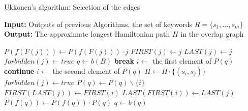 \documentclass[english,twoside,censored,csm,algorithms-track-2020]{HYthesisML}
\theoremstyle{plain}
\theoremstyle{definition}
\numberwithin{testexample}{chapter}
\begin{document}
  \begin{algorithm}[!ht]
    \caption{Ukkonen's algorithm: Selection of the edges} \label{ukk-h}
    \hspace*{\algorithmicindent} \textbf{Input:} Outputs of previous Algorithms, the set of keywords $R=\{s_1,...,s_m\}$ \\
    \hspace*{\algorithmicindent} \textbf{Output:} The approximate longest Hamiltonian path $H$ in the overlap graph
    \begin{algorithmic}[1]
            \State $P(f(F(j)))\gets P(f(F(j)))\cdot {j}$
            \State $FIRST(j)\gets j$
            \State $LAST(j)\gets j$
          \Else
            \State $forbidden(j)\gets true$
          \EndIf
        \EndFor  
        \State $q\gets b(B)$
               \footnotemark[1]
                \State \textbf{break}
              \EndIf
              \State $i\gets$ the first element of $P(q)$
                  \State \textbf{continue}
                \Else
                  \State $i\gets$ the second element of $P(q)$
                \EndIf
              \EndIf  
              \State $H\gets H\cdot \{(s_i,s_j)\}$
              \State $forbidden(j)\gets true$
              \State $P(q)\gets P(q) \backslash\{i\}$
              \State $FIRST(LAST(j))\gets FIRST(i)$
              \State $LAST(FIRST(i))\gets LAST(j)$
            \EndFor
          \State $P(f(q))\gets P(f(q))\cdot P(q)$
          \EndIf
          \State $q\gets b(q)$
        \EndWhile
      \EndFunction
    \end{algorithmic}
  \end{algorithm}
\end{document}

